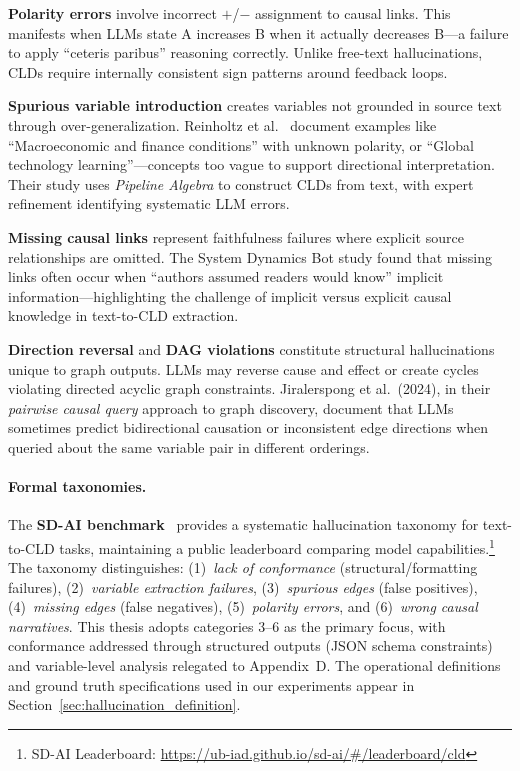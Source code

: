 \textbf{Polarity errors} involve incorrect $+$/$-$ assignment to causal links. This manifests when LLMs state A increases B when it actually decreases B---a failure to apply ``ceteris paribus'' reasoning correctly. Unlike free-text hallucinations, CLDs require internally consistent sign patterns around feedback loops.

\textbf{Spurious variable introduction} creates variables not grounded in source text through over-generalization. Reinholtz et al.\ \citep{reinholtz2025pipelinealgebra} document examples like ``Macroeconomic and finance conditions'' with unknown polarity, or ``Global technology learning''---concepts too vague to support directional interpretation. Their study uses \textit{Pipeline Algebra} to construct CLDs from text, with expert refinement identifying systematic LLM errors.

\textbf{Missing causal links} represent faithfulness failures where explicit source relationships are omitted. The System Dynamics Bot study found that missing links often occur when ``authors assumed readers would know'' implicit information---highlighting the challenge of implicit versus explicit causal knowledge in text-to-CLD extraction.

\textbf{Direction reversal} and \textbf{DAG violations} constitute structural hallucinations unique to graph outputs. LLMs may reverse cause and effect or create cycles violating directed acyclic graph constraints. Jiralerspong et al.\ (2024), in their \textit{pairwise causal query} approach to graph discovery, document that LLMs sometimes predict bidirectional causation or inconsistent edge directions when queried about the same variable pair in different orderings.

\paragraph{Formal taxonomies.} The \textbf{SD-AI benchmark}~\citep{schoenberg2025aibuildsdmodels} provides a systematic hallucination taxonomy for text-to-CLD tasks, maintaining a public leaderboard comparing model capabilities.\footnote{SD-AI Leaderboard: \url{https://ub-iad.github.io/sd-ai/\#/leaderboard/cld}} The taxonomy distinguishes: (1)~\textit{lack of conformance} (structural/formatting failures), (2)~\textit{variable extraction failures}, (3)~\textit{spurious edges} (false positives), (4)~\textit{missing edges} (false negatives), (5)~\textit{polarity errors}, and (6)~\textit{wrong causal narratives}. This thesis adopts categories 3--6 as the primary focus, with conformance addressed through structured outputs (JSON schema constraints) and variable-level analysis relegated to Appendix~D. The operational definitions and ground truth specifications used in our experiments appear in Section~\ref{sec:hallucination_definition}.

